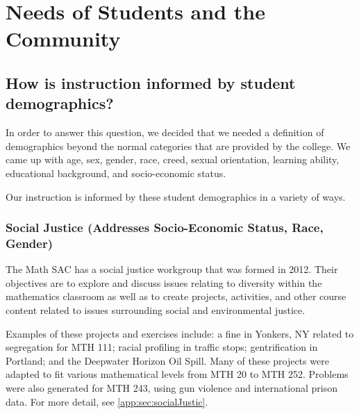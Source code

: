 \chapter{Needs of Students and the Community}
\section{How is instruction informed by student demographics?}
In order to answer this question, we decided that we needed a definition of demographics beyond the normal categories that are provided by the college. We came up with age, sex, gender, race, creed, sexual orientation, learning ability, educational background, and socio-economic status.
\label{needs:sec:definitiondiversity}

Our instruction is informed by these student demographics in a variety of ways.

\subsection{Social Justice (Addresses Socio-Economic Status, Race, Gender)}
The Math SAC has a social justice workgroup that was formed in 2012.  Their objectives are to explore and discuss issues relating to diversity within the mathematics classroom as well as to create projects, activities, and other course content related to issues surrounding social and environmental justice.

Examples of these projects and exercises include: a fine in Yonkers, NY related to segregation
for MTH 111; racial profiling in traffic stops; gentrification in Portland; and the Deepwater Horizon Oil Spill. Many of these projects were adapted to fit various mathematical levels from MTH 20 to MTH 252. Problems were also generated for MTH 243, using gun violence and international prison data. For more detail, see \vref{app:sec:socialJustic}.

